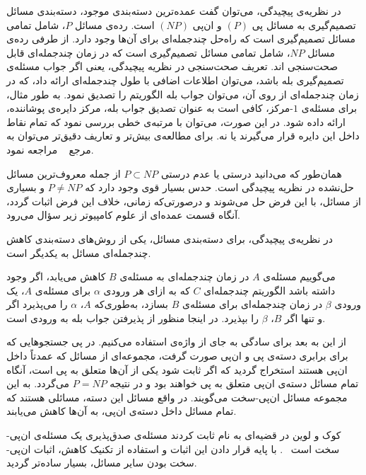 
در نظریه‌ی پیچیدگی، می‌توان گفت عمده‌ترین دسته‌بندی موجود، دسته‌بندی مسائل تصمیم‌گیری به مسائل پی $(P)$ و ان‌پی $(NP)$ است.
رده‌ی مسائل $P$، شامل تمامی مسائل تصمیم‌گیری است که راه‌حل چندجمله‌ای برای آن‌ها وجود دارد.
از طرفی رده‌ی مسائل $NP$، شامل تمامی مسائل تصمیم‌گیری است که در زمان چندجمله‌ای قابل صحت‌سنجی اند.
تعریف صحت‌سنجی در نظریه پیچیدگی، یعنی اگر جواب مسئله‌ی تصمیم‌گیری بله باشد، می‌توان اطلاعات اضافی با طول چندجمله‌ای ارائه داد، که در زمان چندجمله‌ای از روی آن، می‌توان جواب بله الگوریتم را تصدیق نمود.
به طور مثال، برای مسئله‌ی $1$-مرکز، کافی است به عنوان تصدیق جواب بله، مرکز دایره‌ی پوشاننده، ارائه داده شود.
در این صورت، می‌توان با مرتبه‌ی خطی بررسی نمود که تمام نقاط داخل این دایره قرار می‌گیرند یا نه.
برای مطالعه‌ی بیش‌تر و تعاریف دقیق‌تر می‌توان به مرجع ~ مراجعه نمود.

همان‌طور که می‌دانید درستی یا عدم درستی $P \subset NP$ از جمله معروف‌ترین مسائل حل‌نشده در نظریه پیچیدگی است.
حدس بسیار قوی وجود دارد که $P \neq NP$ و بسیاری از مسائل، با این فرض حل می‌شوند و درصورتی‌که زمانی، خلاف این فرض اثبات گردد، آنگاه قسمت عمده‌ای از علوم کامپیوتر زیر سؤال می‌رود.

در نظریه‌ی پیچیدگی، برای دسته‌بندی مسائل، یکی از روش‌های دسته‌بندی کاهش چندجمله‌ای مسائل به یکدیگر است. 


می‌گوییم مسئله‌ی $A$ در زمان چندجمله‌ای به مسئله‌ی $B$ کاهش می‌یابد، اگر وجود داشته باشد الگوریتم چندجمله‌ای $C$ که به ازای هر ورودی $\alpha$ برای مسئله‌ی $A$، یک ورودی $\beta$ در زمان چندجمله‌ای برای مسئله‌ی $B$ بسازد، به‌طوری‌که $A$، $\alpha$ را می‌پذیرد اگر و تنها اگر $B$، $\beta$ را بپذیرد. در اینجا منظور از پذیرفتن جواب بله به ورودی است.


از این به بعد برای سادگی به جای  از واژه‌ی  استفاده می‌کنیم.
در پی جستجوهایی که برای برابری دسته‌ی پی و ان‌پی صورت گرفت، مجموعه‌ای از مسائل که عمدتاً داخل ان‌پی هستند استخراج گردید که اگر ثابت شود یکی از آن‌ها متعلق به پی است، آنگاه تمام مسائل دسته‌ی ان‌پی متعلق به پی خواهند بود و در نتیجه $P = NP$ می‌گردد.
به این مجموعه مسائل ان‌پی-سخت می‌گویند.
در واقع مسائل این دسته، مسائلی هستند که تمام مسائل داخل دسته‌ی ان‌پی، به آن‌ها کاهش می‌یابند.

کوک و لوین در قضیه‌ای به نام  ثابت کردند مسئله‌ی صدق‌پذیری یک مسئله‌ی ان‌پی-سخت است ~.
با پایه قرار دادن این اثبات و استفاده از تکنیک کاهش، اثبات ان‌پی-سخت بودن سایر مسائل، بسیار ساده‌تر گردید.

